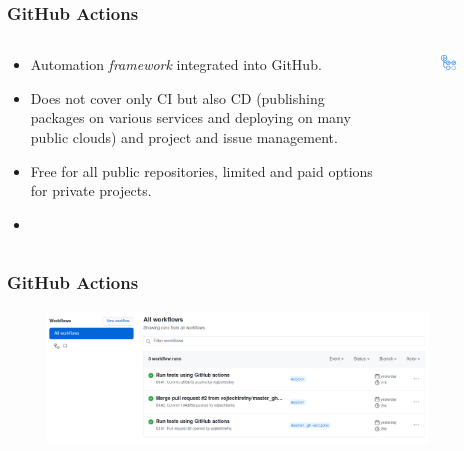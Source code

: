 \documentclass[aspectratio=169]{beamer}
\begin{document}
\begin{frame}
	\frametitle{GitHub Actions}
	
	\begin{columns}
\begin{column}{0.6\textwidth}
	\begin{block}{}
		\begin{itemize}
			\item Automation \emph{framework} integrated into GitHub.
			\item Does not cover only CI but also CD (publishing packages on various services and deploying on many public clouds) and project and issue management.
			\item Free for all public repositories, limited and paid options for private projects.
			\item {}
		\end{itemize}
	\end{block}
\end{column}
\begin{column}{0.4\textwidth}
	\begin{figure}[ht!]
	\begin{center}
  	  \includegraphics[width=0.5\textwidth]{img/gh-actions-logo.png}
	\end{center}
	\end{figure}
\end{column}
\end{columns}

\end{frame}

\begin{frame}
	\frametitle{GitHub Actions}
	\begin{figure}[ht!]
	\begin{center}
  	  \includegraphics[width=0.9\textwidth]{img/gh-actions-1.png}
	\end{center}
	\end{figure}
\end{frame}
\end{document}
